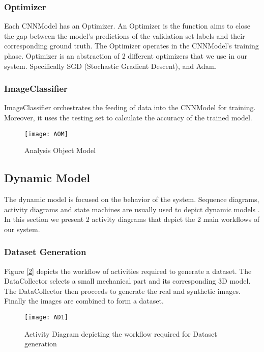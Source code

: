 \subsubsection{Optimizer}
Each CNNModel has an Optimizer. An Optimizer is the function aims to close the gap between the model's predictions of the validation set labels and their corresponding ground truth. The Optimizer operates in the CNNModel's training phase. Optimizer is an abstraction of 2 different optimizers that we use in our system. Specifically SGD (Stochastic Gradient Descent), and Adam.

\subsubsection{ImageClassifier}
ImageClassifier orchestrates the feeding of data into the CNNModel for training. Moreover, it uses the testing set to calculate the accuracy of the trained model.

\begin{figure}[H]
\centering
  \texttt{[image: AOM]}
\caption{Analysis Object Model}
\label{fig:AOM}
\end{figure}

\subsection{Dynamic Model}

The dynamic model is focused on the behavior of the system. Sequence diagrams, activity diagrams and state machines are usually used to depict dynamic models \cite{bruegge2004object}. In this section we present 2 activity diagrams that depict the 2 main workflows of our system.

\subsubsection{Dataset Generation}

Figure [\ref{fig:AD1}] depicts the workflow of activities required to generate a dataset. The DataCollector selects a small mechanical part and its corresponding 3D model. The DataCollector then proceeds to generate the real and synthetic images. Finally the images are combined to form a dataset.

\begin{figure}[h]
\centering
  \texttt{[image: AD1]}
\caption{Activity Diagram depicting the workflow required for Dataset generation}
\label{fig:AD1}
\end{figure}


